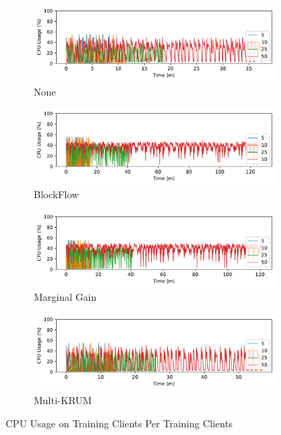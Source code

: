 \begin{figure}[!ht]
    \centering
    \begin{subfigure}[b]{0.49\textwidth}
        \centering
        \includegraphics[width=\textwidth]{graphics/clients/cpu_none_client.pdf}
        \caption{None}
    \end{subfigure}
    \hfill
    \begin{subfigure}[b]{0.49\textwidth}
        \centering
        \includegraphics[width=\textwidth]{graphics/clients/cpu_blockflow_client.pdf}
        \caption{BlockFlow}
    \end{subfigure}
    \hfill
    \begin{subfigure}[b]{0.49\textwidth}
        \centering
        \includegraphics[width=\textwidth]{graphics/clients/cpu_marginalgain_client.pdf}
        \caption{Marginal Gain}
    \end{subfigure}
    \hfill
    \begin{subfigure}[b]{0.49\textwidth}
        \centering
        \includegraphics[width=\textwidth]{graphics/clients/cpu_multikrum_client.pdf}
        \caption{Multi-KRUM}
    \end{subfigure}
    \caption{CPU Usage on Training Clients Per Training Clients}
    \label{fig:cpu_clients_degree_clients}
\end{figure}

